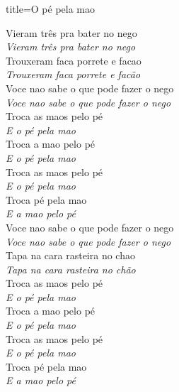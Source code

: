 \documentclass[fontsize=14pt, twoside]{scrreprt}
\begin{document}
\begin{multicols*}{2}
\begin{song}{title={O pé pela mao}}
        \begin{verse*}
            Vieram três pra bater no nego\\
            \textit{Vieram três pra bater no nego}\\
            Trouxeram faca porrete e facao\\
            \textit{Trouxeram faca porrete e facão}\\
            Voce nao sabe o que pode fazer o nego\\
            \textit{Voce nao sabe o que pode fazer o nego}\\
            Troca as maos pelo pé\\
            \textit{E o pé pela mao}\\
            Troca a mao pelo pé\\
            \textit{E o pé pela mao}\\
            Troca as maos pelo pé\\
            \textit{E o pé pela mao}\\
            Troca pé pela mao\\
            \textit{E a mao pelo pé}\\
            Voce nao sabe o que pode fazer o nego\\
            \textit{Voce nao sabe o que pode fazer o nego}\\
            Tapa na cara rasteira no chao\\
            \textit{Tapa na cara rasteira no chão}\\
            Troca as maos pelo pé\\
            \textit{E o pé pela mao}\\
            Troca a mao pelo pé\\
            \textit{E o pé pela mao}\\
            Troca as maos pelo pé\\
            \textit{E o pé pela mao}\\
            Troca pé pela mao\\
            \textit{E a mao pelo pé}\\
        \end{verse*}
\end{song}



\end{multicols*}
\end{document}
